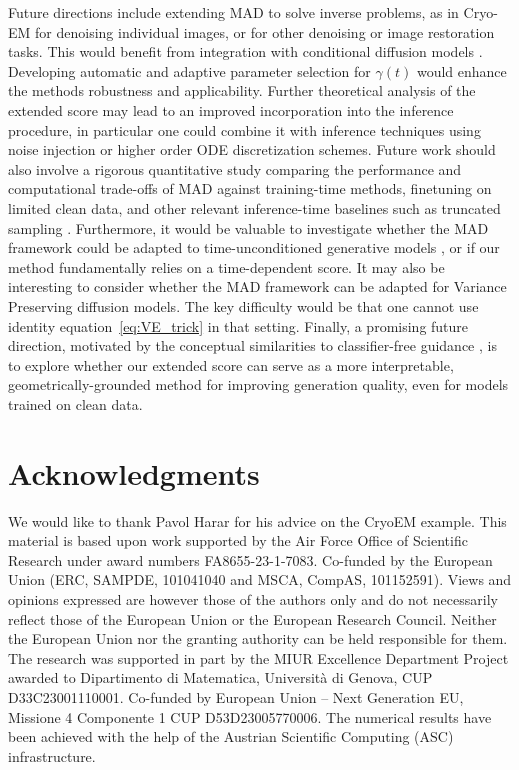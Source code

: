 \documentclass{article}
\def\eqref#1{equation~\ref{#1}}
\theoremstyle{plain}
\theoremstyle{definition}
\theoremstyle{remark}
\begin{document}
Future directions include extending MAD to solve inverse problems, as in Cryo-EM for denoising individual images, or for other denoising or image restoration tasks.
This would benefit from integration with conditional diffusion models %
\citep{chungdiffusion, chung2022improving}. Developing automatic and adaptive parameter selection for $\gamma(t)$ would enhance the methods robustness and applicability. Further theoretical analysis of the extended score may lead to an improved incorporation into the inference procedure, in particular one could combine it with inference techniques using noise injection or higher order ODE discretization schemes. Future work should also involve a rigorous quantitative study comparing the performance and computational trade-offs of MAD against training-time methods, finetuning on limited clean data, and other relevant inference-time baselines such as truncated sampling \citep{daras2025how}. Furthermore, it would be valuable to investigate whether the MAD framework could be adapted to time-unconditioned generative models \citep{sun2025is}, or if our method fundamentally relies on a time-dependent score. It may also be interesting to consider whether the MAD framework can be adapted for Variance Preserving diffusion models. The key difficulty would be that one cannot use identity \eqref{eq:VE_trick} in that setting. Finally, a promising future direction, motivated by the conceptual similarities to classifier-free guidance \citep{ho2021classifierfree}, is to explore whether our extended score can serve as a more interpretable, geometrically-grounded method for improving generation quality, even for models trained on clean data.


\section*{Acknowledgments}
We would like to thank Pavol Harar for his advice on the CryoEM example.
This material is based upon work supported by the Air Force Office of Scientific Research under award numbers FA8655-23-1-7083. Co-funded by the European Union (ERC, SAMPDE, 101041040  and MSCA, CompAS, 101152591). Views and opinions
expressed are however those of the authors only and do not necessarily reflect those of the European
Union or the European Research Council. Neither the European Union nor the granting authority
can be held responsible for them. 
The research was supported in part by the MIUR Excellence Department Project awarded to Dipartimento di Matematica, Università di Genova, CUP D33C23001110001. Co-funded by European Union – Next Generation EU, Missione 4 Componente 1 CUP D53D23005770006. The numerical results have been achieved with the help of the Austrian Scientific Computing (ASC) infrastructure.
\end{document}
